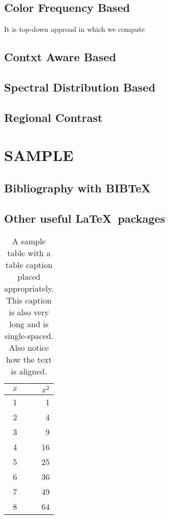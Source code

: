 \documentclass[MTech]{iitmdiss}
\begin{document}
\section{Color Frequency Based}
It is top-down approad in which we compute 
\section{Contxt Aware Based}
\section{Spectral Distribution Based}
\section{Regional Contrast}





\chapter{SAMPLE} 
 \section{Bibliography with BIB\TeX} 
 \section{Other useful \LaTeX\ packages}

 
 \begin{table}[htbp]
   \caption{A sample table with a table caption placed
     appropriately. This caption is also very long and is
     single-spaced.  Also notice how the text is aligned.}
   \begin{center}
   \begin{tabular}[c]{|c|r|} \hline
     $x$ & $x^2$ \\ \hline
     1  &  1   \\
     2  &  4  \\
     3  &  9  \\
     4  &  16  \\
     5  &  25  \\
     6  &  36  \\
     7  &  49  \\
     8  &  64  \\ \hline
   \end{tabular}
   \label{tab:sample}
   \end{center}
 \end{table}
\end{document}
